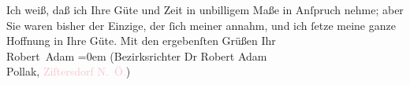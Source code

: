            Ich weiß, daß ich Ihre Güte und Zeit in unbilligem Maße in Anſpruch nehme; aber
                    Sie waren bisher der Einzige, der ſich meiner annahm, und ich ſetze meine ganze
                    Hoffnung in Ihre Güte.\pend
           \pstart
           Mit den ergebenſten Grüßen\pend
           \pstart
           Ihr{\\[\baselineskip]}\spacefill\mbox{Robert Adam}\pend
           \leftskip=0em{}\pstart
           \noindent{}\raggedleft{}(Bezirksrichter Dr Robert Adam{\\}Pollak, \textcolor{pink}{Ziſtersdorf{ }\textsc{N. Ö.}}{}\ledrightnote{\textcolor{pink}{Zistersdorf}})\pend
           \endnumbering{}  
      